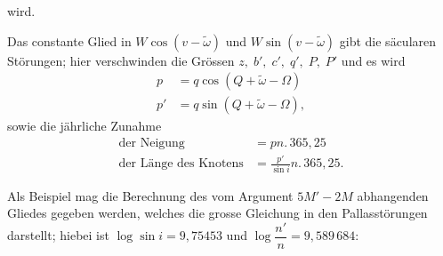 \noindent wird.
\par\noindent\hspace*{\parindent}Das constante Glied in \(W\cos(v-\tilde\omega)\) und \(W\sin(v-\tilde\omega)\) gibt die säcularen Störungen; hier verschwinden die Grössen \(z,\;b',\;c',\;q',\;P,\;P'\) und es wird
\[
\begin{aligned}
p&=q\cos(Q+\tilde\omega-\Omega)\\
p'&=q\sin(Q+\tilde\omega-\Omega),
\end{aligned}
\]
\noindent sowie die jährliche Zunahme
\[
\begin{aligned}
\text{der Neigung}&=pn\mathord{.}\,365{,}25\\
\text{der Länge des Knotens}&=\frac{p'}{\sin i}n\mathord{.}\,365{,}25.
\end{aligned}
\]
\par\noindent\hspace*{\parindent}Als Beispiel mag die Berechnung des vom Argument \(5M'-2M\) abhangenden Gliedes gegeben werden, welches die grosse Gleichung in den Pallasstörungen darstellt; hiebei ist \(\log\sin i=9{,}75453\) und \(\log\dfrac{n'}{n}=9{,}589\,684\):
\begingroup
\newcommand{\VSevenLogPoint}{\mathord{.}\mkern3mu}
\newcommand{\VSevenLogFive}{\VSevenLogPoint\VSevenLogPoint\VSevenLogPoint\VSevenLogPoint\VSevenLogPoint}
